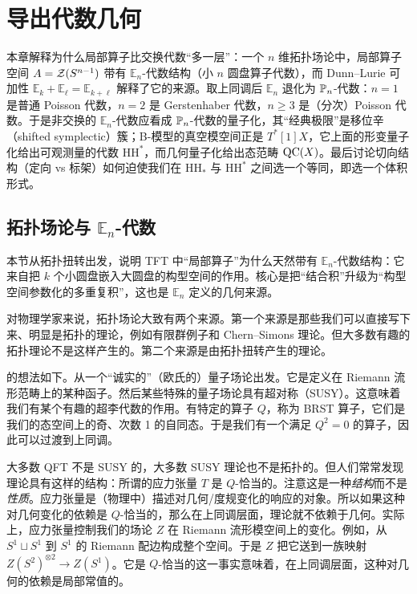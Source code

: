 \chapter{导出代数几何}\label{ch:14}

\begin{keytakeaways}
本章解释为什么局部算子比交换代数“多一层”：一个 $n$ 维拓扑场论中，局部算子空间 $A=\mathcal{Z}(S^{n-1})$ 带有 $\mathbb{E}_n$-代数结构（小 $n$ 圆盘算子代数），而 Dunn–Lurie 可加性 $\mathbb{E}_k+\mathbb{E}_\ell=\mathbb{E}_{k+\ell}$ 解释了它的来源。取上同调后 $\mathbb{E}_n$ 退化为 $\mathbb{P}_n$-代数：$n=1$ 是普通 Poisson 代数，$n=2$ 是 Gerstenhaber 代数，$n\ge3$ 是（分次）Poisson 代数。于是非交换的 $\mathbb{E}_n$-代数应看成 $\mathbb{P}_n$-代数的量子化，其“经典极限”是移位辛（shifted symplectic）簇；B-模型的真空模空间正是 $T^*[1]X$，它上面的形变量子化给出可观测量的代数 $\mathrm{HH}^*$，而几何量子化给出态范畴 $\mathrm{QC}(X)$。最后讨论切向结构（定向 vs 标架）如何迫使我们在 $\mathrm{HH}_*$ 与 $\mathrm{HH}^*$ 之间选一个等同，即选一个体积形式。
\end{keytakeaways}

\section{拓扑场论与 $\mathbb{E}_n$-代数}\label{sec:14-1}

\begin{sectionkey}
本节从拓扑扭转出发，说明 TFT 中“局部算子”为什么天然带有 $\mathbb{E}_n$-代数结构：它来自把 $k$ 个小圆盘嵌入大圆盘的构型空间的作用。核心是把“结合积”升级为“构型空间参数化的多重复积”，这也是 $\mathbb{E}_n$ 定义的几何来源。
\end{sectionkey}

对物理学家来说，拓扑场论大致有两个来源。第一个来源是那些我们可以直接写下来、明显是拓扑的理论，例如有限群例子和 Chern–Simons 理论。但大多数有趣的拓扑理论不是这样产生的。第二个来源是由拓扑扭转产生的理论。

的想法如下。从一个“诚实的”（欧氏的）量子场论出发。它是定义在 Riemann 流形范畴上的某种函子。然后某些特殊的量子场论具有超对称（SUSY）。这意味着我们有某个有趣的超李代数的作用。有特定的算子 $Q$，称为 BRST 算子，它们是我们的态空间上的奇、次数 1 的自同态。于是我们有一个满足 $Q^2=0$ 的算子，因此可以过渡到上同调。

大多数 QFT 不是 SUSY 的，大多数 SUSY 理论也不是拓扑的。但人们常常发现理论具有这样的结构：所谓的应力张量 $T$ 是 $Q$-恰当的。注意这是一种\emph{结构}而不是\emph{性质}。应力张量是（物理中）描述对几何/度规变化的响应的对象。所以如果这种对几何变化的依赖是 $Q$-恰当的，那么在上同调层面，理论就不依赖于几何。实际上，应力张量控制我们的场论 $Z$ 在 Riemann 流形模空间上的变化。例如，从 $S^1\sqcup S^1$ 到 $S^1$ 的 Riemann 配边构成整个空间。于是 $Z$ 把它送到一族映射 $Z(S^2)^{\otimes2}\to Z(S^1)$。它是 $Q$-恰当的这一事实意味着，在上同调层面，这种对几何的依赖是局部常值的。

